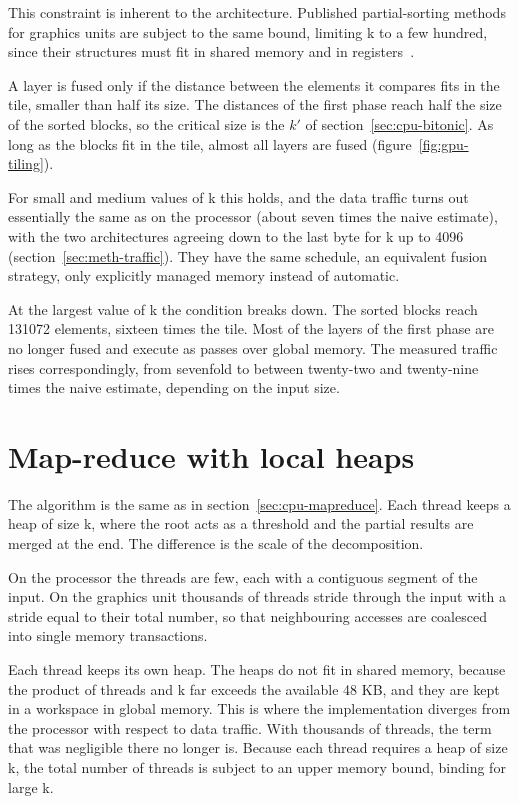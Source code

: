 This constraint is inherent to the architecture. Published partial-sorting
methods for graphics units are subject to the same bound, limiting k to a few
hundred, since their structures must fit in shared memory and in
registers~\cite{shanbhag2018,zhang2023gputopk}.

A layer is fused only if the distance between the elements it compares fits in
the tile, smaller than half its size. The distances of the first phase reach
half the size of the sorted blocks, so the critical size is the $k'$ of
section~\ref{sec:cpu-bitonic}. As long as the blocks fit in the tile, almost
all layers are fused (figure~\ref{fig:gpu-tiling}).

For small and medium values of k this holds, and the data traffic turns out
essentially the same as on the processor (about seven times the naive
estimate), with the two architectures agreeing down to the last byte for k up
to 4096 (section~\ref{sec:meth-traffic}). They have the same schedule, an
equivalent fusion strategy, only explicitly managed memory instead of
automatic.

At the largest value of k the condition breaks down. The sorted blocks reach
131072 elements, sixteen times the tile. Most of the layers of the first phase
are no longer fused and execute as passes over global memory. The measured
traffic rises correspondingly, from sevenfold to between twenty-two and
twenty-nine times the naive estimate, depending on the input size.



\section{Map-reduce with local heaps}
\label{sec:gpu-mapreduce}

The algorithm is the same as in section~\ref{sec:cpu-mapreduce}. Each thread
keeps a heap of size k, where the root acts as a threshold and the partial
results are merged at the end. The difference is the scale of the
decomposition.

On the processor the threads are few, each with a contiguous segment of the
input. On the graphics unit thousands of threads stride through the input with
a stride equal to their total number, so that neighbouring accesses are
coalesced into single memory transactions.

Each thread keeps its own heap. The heaps do not fit in shared memory, because
the product of threads and k far exceeds the available 48 KB, and they are kept
in a workspace in global memory. This is where the implementation diverges from
the processor with respect to data traffic. With thousands of threads, the term
that was negligible there no longer is. Because each thread requires a heap of
size k, the total number of threads is subject to an upper memory bound,
binding for large k.

